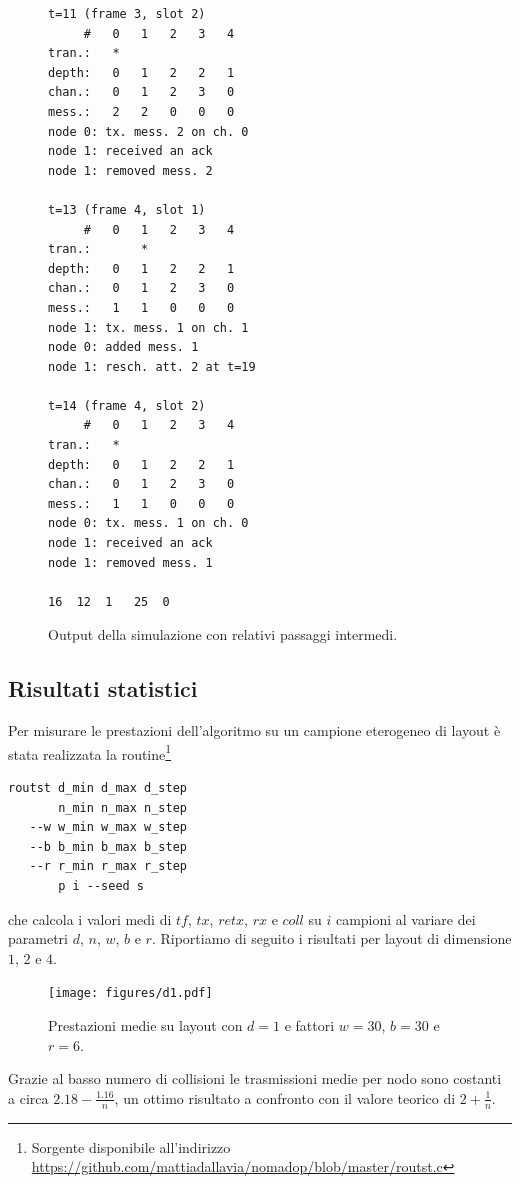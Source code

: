 \documentclass[a4paper,11pt]{article}
\theoremstyle{definition}
\begin{document}
\begin{figure}[H]
\begin{multicols}{3}
\begin{Verbatim}[fontsize=\scriptsize,tabsize=2]
t=11 (frame 3, slot 2)
     #   0   1   2   3   4 
tran.:   *                 
depth:   0   1   2   2   1 
chan.:   0   1   2   3   0 
mess.:   2   2   0   0   0 
node 0: tx. mess. 2 on ch. 0
node 1: received an ack
node 1: removed mess. 2

t=13 (frame 4, slot 1)
     #   0   1   2   3   4 
tran.:       *             
depth:   0   1   2   2   1 
chan.:   0   1   2   3   0 
mess.:   1   1   0   0   0 
node 1: tx. mess. 1 on ch. 1
node 0: added mess. 1
node 1: resch. att. 2 at t=19

t=14 (frame 4, slot 2)
     #   0   1   2   3   4 
tran.:   *                 
depth:   0   1   2   2   1 
chan.:   0   1   2   3   0 
mess.:   1   1   0   0   0 
node 0: tx. mess. 1 on ch. 0
node 1: received an ack
node 1: removed mess. 1

16	12	1	25	0
\end{Verbatim}
\end{multicols}
\caption{Output della simulazione con relativi passaggi intermedi.}
\end{figure}

\subsection{Risultati statistici}

Per misurare le prestazioni dell'algoritmo su un campione eterogeneo di layout è stata realizzata la routine\footnote{Sorgente disponibile all'indirizzo \url{https://github.com/mattiadallavia/nomadop/blob/master/routst.c}}

\smallskip

{\centering
\begin{BVerbatim}
routst d_min d_max d_step
       n_min n_max n_step
   --w w_min w_max w_step
   --b b_min b_max b_step
   --r r_min r_max r_step
       p i --seed s
\end{BVerbatim}

}

che calcola i valori medi di $tf$, $tx$, $retx$, $rx$ e $coll$ su $i$ campioni al variare dei parametri $d$, $n$, $w$, $b$ e $r$. Riportiamo di seguito i risultati per layout di dimensione $1$, $2$ e $4$.

\begin{figure}[H]
\centering
\texttt{[image: figures/d1.pdf]}
\caption{Prestazioni medie su layout con $d=1$ e fattori $w=30$, $b=30$ e $r=6$.}
\end{figure}

Grazie al basso numero di collisioni le trasmissioni medie per nodo sono costanti a circa $2.18 - \frac{1.16}{n}$, un ottimo risultato a confronto con il valore teorico di $2 + \frac{1}{n}$.
\end{document}
